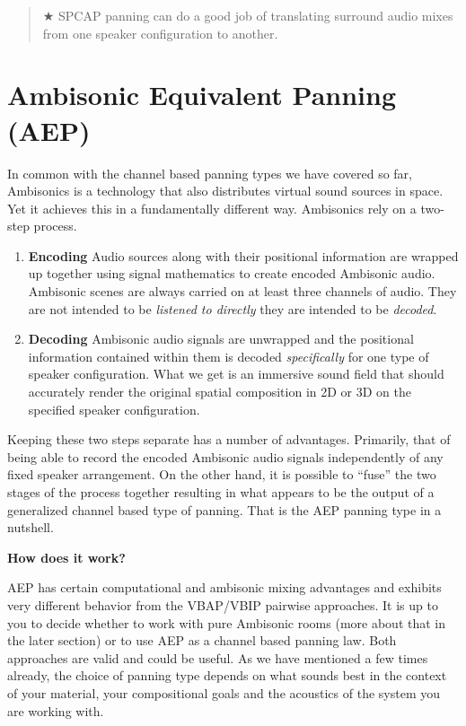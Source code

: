 \documentclass[
  letterpaper,
  DIV=11,
  numbers=noendperiod]{scrreport}
\providecommand{\tightlist}{%
  \setlength{\itemsep}{0pt}\setlength{\parskip}{0pt}}\usepackage{longtable,booktabs,array}
\begin{document}
\begin{quote}
★ SPCAP panning can do a good job of translating surround audio mixes
from one speaker configuration to another.
\end{quote}

\hypertarget{ambisonic-equivalent-panning-aep}{%
\section{Ambisonic Equivalent Panning
(AEP)}\label{ambisonic-equivalent-panning-aep}}

In common with the channel based panning types we have covered so far,
Ambisonics is a technology that also distributes virtual sound sources
in space. Yet it achieves this in a fundamentally different way.
Ambisonics rely on a two-step process.

\begin{enumerate}
\def\labelenumi{\arabic{enumi}.}
\tightlist
\item
  \textbf{Encoding} Audio sources along with their positional
  information are wrapped up together using signal mathematics to create
  encoded Ambisonic audio. Ambisonic scenes are always carried on at
  least three channels of audio. They are not intended to be
  \emph{listened to directly} they are intended to be \emph{decoded}.
\item
  \textbf{Decoding} Ambisonic audio signals are unwrapped and the
  positional information contained within them is decoded
  \emph{specifically} for one type of speaker configuration. What we get
  is an immersive sound field that should accurately render the original
  spatial composition in 2D or 3D on the specified speaker
  configuration.
\end{enumerate}

Keeping these two steps separate has a number of advantages. Primarily,
that of being able to record the encoded Ambisonic audio signals
independently of any fixed speaker arrangement. On the other hand, it is
possible to ``fuse'' the two stages of the process together resulting in
what appears to be the output of a generalized channel based type of
panning. That is the AEP panning type in a nutshell.

\textbf{How does it work?}

AEP has certain computational and ambisonic mixing advantages and
exhibits very different behavior from the VBAP/VBIP pairwise approaches.
It is up to you to decide whether to work with pure Ambisonic rooms
(more about that in the later section) or to use AEP as a channel based
panning law. Both approaches are valid and could be useful. As we have
mentioned a few times already, the choice of panning type depends on
what sounds best in the context of your material, your compositional
goals and the acoustics of the system you are working with.
\end{document}
